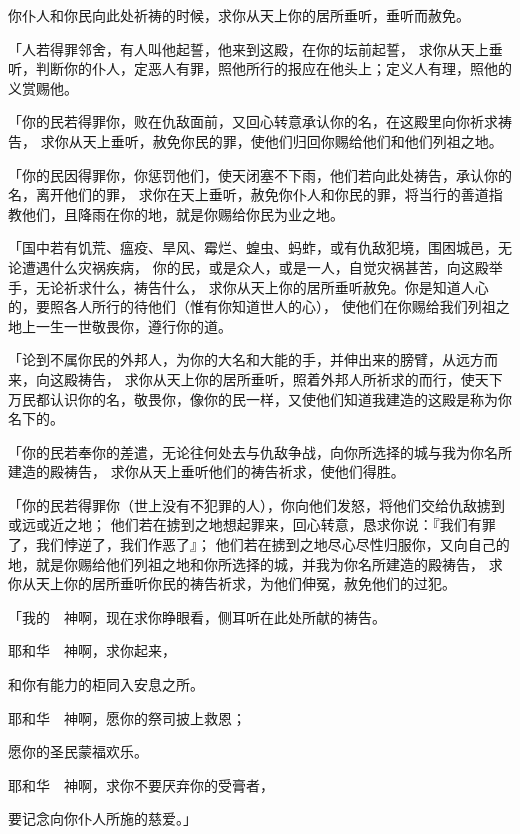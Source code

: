 {你仆人和你民{}向此处祈祷的时候，求你从天上你的居所垂听，垂听而赦免。
\par }{\PP {}「人若得罪邻舍，有人叫他起誓，他来到这殿，在你的坛前起誓，
求你从天上垂听，判断你的仆人，定恶人有罪，照他所行的报应在他头上；定义人有理，照他的义赏赐他。
\par }{\PP {}「你的民{}若得罪你，败在仇敌面前，又回心转意承认你的名，在这殿里向你祈求祷告，
求你从天上垂听，赦免你民{}的罪，使他们归回你赐给他们和他们列祖之地。
\par }{\PP {}「你的民因得罪你，你惩罚他们，使天闭塞不下雨，他们若向此处祷告，承认你的名，离开他们的罪，
求你在天上垂听，赦免你仆人和你民{}的罪，将当行的善道指教他们，且降雨在你的地，就是你赐给你民为业之地。
\par }{\PP {}「国中若有饥荒、瘟疫、旱风、霉烂、蝗虫、蚂蚱，或有仇敌犯境，围困城邑，无论遭遇什么灾祸疾病，
你的民{}，或是众人，或是一人，自觉灾祸甚苦，向这殿举手，无论祈求什么，祷告什么，
求你从天上你的居所垂听赦免。你是知道人心的，要照各人所行的待他们（惟有你知道世人的心），
使他们在你赐给我们列祖之地上一生一世敬畏你，遵行你的道。
\par }{\PP {}「论到不属你民{}的外邦人，为你的大名和大能的手，并伸出来的膀臂，从远方而来，向这殿祷告，
求你从天上你的居所垂听，照着外邦人所祈求的而行，使天下万民都认识你的名，敬畏你，像你的民{}一样，又使他们知道我建造的这殿是称为你名下的。
\par }{\PP {}「你的民若奉你的差遣，无论往何处去与仇敌争战，向你所选择的城与我为你名所建造的殿祷告，
求你从天上垂听他们的祷告祈求，使他们得胜。
\par }{\PP {}「你的民若得罪你（世上没有不犯罪的人），你向他们发怒，将他们交给仇敌掳到或远或近之地；
他们若在掳到之地想起罪来，回心转意，恳求你说：『我们有罪了，我们悖逆了，我们作恶了』；
他们若在掳到之地尽心尽性归服你，又向自己的地，就是你赐给他们列祖之地和你所选择的城，并我为你名所建造的殿祷告，
求你从天上你的居所垂听你民的祷告祈求，为他们伸冤，赦免他们的过犯。
\par }{\Q {}「我的　神啊，现在求你睁眼看，侧耳听在此处所献的祷告。
\par }{\Q {}耶和华　神啊，求你起来，
\par }{\Q 和你有能力的{}柜同入安息之所。
\par }{\Q 耶和华　神啊，愿你的祭司披上救恩；
\par }{\Q 愿你的圣民蒙福欢乐。
\par }{\Q {}耶和华　神啊，求你不要厌弃你的受膏者，
\par }{\Q 要记念向你仆人{}所施的慈爱。」

}
